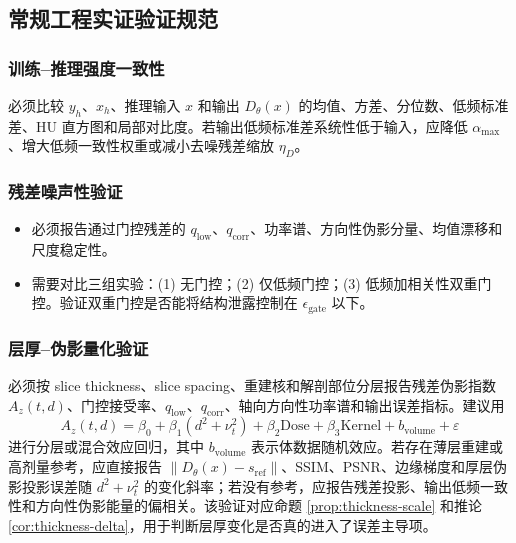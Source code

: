 \documentclass[11pt,a4paper,UTF8,fontset=fandol]{ctexart}
\theoremstyle{definition}
\newcommand{\norm}[1]{\left\lVert#1\right\rVert}
\begin{document}
\subsection{常规工程实证验证规范}

\subsubsection{训练--推理强度一致性}

必须比较 $y_h$、$x_h$、推理输入 $x$ 和输出 $D_\theta(x)$ 的均值、方差、分位数、低频标准差、HU 直方图和局部对比度。若输出低频标准差系统性低于输入，应降低 $\alpha_{\max}$、增大低频一致性权重或减小去噪残差缩放 $\eta_D$。

\subsubsection{残差噪声性验证}

\begin{itemize}[leftmargin=2em]
    \item 必须报告通过门控残差的 $q_{\mathrm{low}}$、$q_{\mathrm{corr}}$、功率谱、方向性伪影分量、均值漂移和尺度稳定性。
    \item 需要对比三组实验：(1) 无门控；(2) 仅低频门控；(3) 低频加相关性双重门控。验证双重门控是否能将结构泄露控制在 $\epsilon_{\mathrm{gate}}$ 以下。
\end{itemize}

\subsubsection{层厚--伪影量化验证}

必须按 slice thickness、slice spacing、重建核和解剖部位分层报告残差伪影指数 $A_z(t,d)$、门控接受率、$q_{\mathrm{low}}$、$q_{\mathrm{corr}}$、轴向方向性功率谱和输出误差指标。建议用
\begin{equation}
    A_z(t,d)
    =
    \beta_0+\beta_1(d^2+\nu_t^2)
    +\beta_2\mathrm{Dose}
    +\beta_3\mathrm{Kernel}
    +b_{\mathrm{volume}}
    +\varepsilon
\end{equation}
进行分层或混合效应回归，其中 $b_{\mathrm{volume}}$ 表示体数据随机效应。若存在薄层重建或高剂量参考，应直接报告 $\norm{D_\theta(x)-s_{\mathrm{ref}}}$、SSIM、PSNR、边缘梯度和厚层伪影投影误差随 $d^2+\nu_t^2$ 的变化斜率；若没有参考，应报告残差投影、输出低频一致性和方向性伪影能量的偏相关。该验证对应命题 \ref{prop:thickness-scale} 和推论 \ref{cor:thickness-delta}，用于判断层厚变化是否真的进入了误差主导项。
\end{document}
